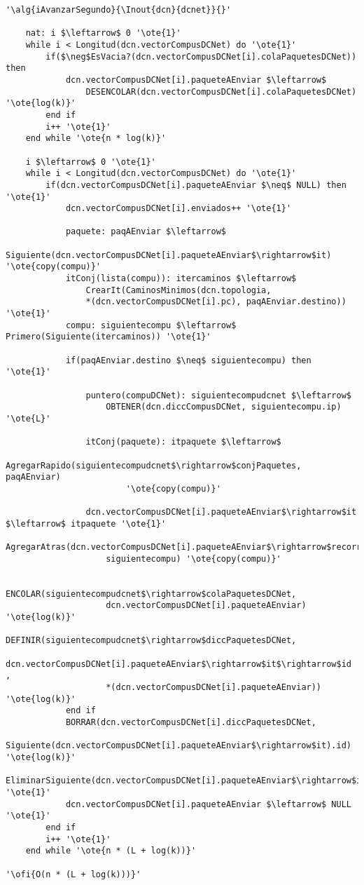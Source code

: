 \begin{lstlisting}[mathescape]
'\alg{iAvanzarSegundo}{\Inout{dcn}{dcnet}}{}'

	nat: i $\leftarrow$ 0 '\ote{1}'
	while i < Longitud(dcn.vectorCompusDCNet) do '\ote{1}'
		if($\neg$EsVacia?(dcn.vectorCompusDCNet[i].colaPaquetesDCNet)) then
			dcn.vectorCompusDCNet[i].paqueteAEnviar $\leftarrow$ 
				DESENCOLAR(dcn.vectorCompusDCNet[i].colaPaquetesDCNet) '\ote{log(k)}'
		end if
		i++ '\ote{1}'
	end while '\ote{n * log(k)}'

	i $\leftarrow$ 0 '\ote{1}'
	while i < Longitud(dcn.vectorCompusDCNet) do '\ote{1}'
		if(dcn.vectorCompusDCNet[i].paqueteAEnviar $\neq$ NULL) then '\ote{1}'
			dcn.vectorCompusDCNet[i].enviados++ '\ote{1}'

			paquete: paqAEnviar $\leftarrow$ 
				Siguiente(dcn.vectorCompusDCNet[i].paqueteAEnviar$\rightarrow$it) '\ote{copy(compu)}'
			itConj(lista(compu)): itercaminos $\leftarrow$ 
				CrearIt(CaminosMinimos(dcn.topologia, 
				*(dcn.vectorCompusDCNet[i].pc), paqAEnviar.destino)) '\ote{1}'
			compu: siguientecompu $\leftarrow$ Primero(Siguiente(itercaminos)) '\ote{1}'

			if(paqAEnviar.destino $\neq$ siguientecompu) then '\ote{1}'

				puntero(compuDCNet): siguientecompudcnet $\leftarrow$ 
					OBTENER(dcn.diccCompusDCNet, siguientecompu.ip) '\ote{L}'
				
				itConj(paquete): itpaquete $\leftarrow$ 
					AgregarRapido(siguientecompudcnet$\rightarrow$conjPaquetes, paqAEnviar) 
						'\ote{copy(compu)}'
				
				dcn.vectorCompusDCNet[i].paqueteAEnviar$\rightarrow$it $\leftarrow$ itpaquete '\ote{1}'
				AgregarAtras(dcn.vectorCompusDCNet[i].paqueteAEnviar$\rightarrow$recorrido, 
					siguientecompu) '\ote{copy(compu)}'

				ENCOLAR(siguientecompudcnet$\rightarrow$colaPaquetesDCNet, 
					dcn.vectorCompusDCNet[i].paqueteAEnviar) '\ote{log(k)}'
				DEFINIR(siguientecompudcnet$\rightarrow$diccPaquetesDCNet, 
					dcn.vectorCompusDCNet[i].paqueteAEnviar$\rightarrow$it$\rightarrow$id ,
					*(dcn.vectorCompusDCNet[i].paqueteAEnviar)) '\ote{log(k)}'
			end if
			BORRAR(dcn.vectorCompusDCNet[i].diccPaquetesDCNet,
				Siguiente(dcn.vectorCompusDCNet[i].paqueteAEnviar$\rightarrow$it).id) '\ote{log(k)}'
			EliminarSiguiente(dcn.vectorCompusDCNet[i].paqueteAEnviar$\rightarrow$it) '\ote{1}'
			dcn.vectorCompusDCNet[i].paqueteAEnviar $\leftarrow$ NULL '\ote{1}'
		end if
		i++ '\ote{1}'
	end while '\ote{n * (L + log(k))}'	

'\ofi{O(n * (L + log(k)))}'
\end{lstlisting}


